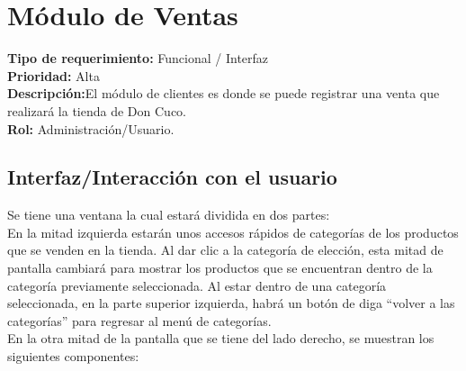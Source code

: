 \documentclass[a4paper,DIV=12]{scrreprt}
\begin{document}


\newpage
\setcounter{chapter}{6}
\setcounter{section}{-1}
\setcounter{subsection}{-1}
\section{Módulo de Ventas}
\noindent
\textbf{Tipo de requerimiento:} Funcional / Interfaz\\
\textbf{Prioridad:} Alta\\
\textbf{Descripción:}El módulo de clientes es donde se puede registrar una venta que realizará la tienda de Don Cuco. \\
\textbf{Rol:} Administración/Usuario.

\subsection*{Interfaz/Interacción con el usuario}
Se tiene una ventana la cual estará dividida en dos partes:\\
En la mitad izquierda estarán unos accesos rápidos de categorías de los productos que se venden en la tienda. Al dar clic a la categoría de elección, esta mitad de pantalla cambiará para mostrar los productos que se encuentran dentro de la categoría previamente seleccionada. Al estar dentro de una categoría seleccionada, en la parte superior izquierda, habrá un botón de diga “volver a las categorías” para regresar al menú de categorías.\\ 
En la otra mitad de la pantalla que se tiene del lado derecho, se muestran los siguientes componentes: 
 \\
\end{document}
